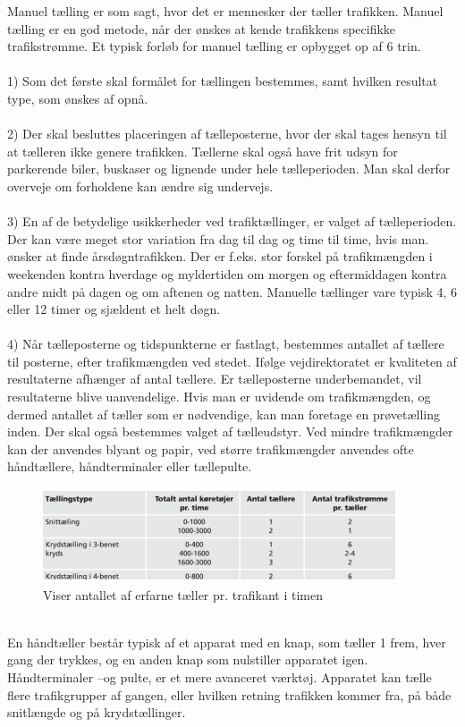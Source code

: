 Manuel tælling er som sagt, hvor det er mennesker der tæller trafikken. Manuel tælling er en god metode,
når der ønskes at kende trafikkens specifikke trafikstrømme. Et typisk forløb for manuel tælling er opbygget
op af 6 trin.
\\\\
1) Som det første skal formålet for tællingen bestemmes, samt hvilken resultat type, som ønskes af opnå.
\\\\
2) Der skal besluttes placeringen af tælleposterne, hvor der skal tages hensyn til at tælleren ikke genere
trafikken. Tællerne skal også have frit udsyn for parkerende biler, buskaser og lignende under hele
tælleperioden. Man skal derfor overveje om forholdene kan ændre sig undervejs.
\\\\
3) En af de betydelige usikkerheder ved trafiktællinger, er valget af tælleperioden. Der kan være meget stor
variation fra dag til dag og time til time, hvis man. ønsker at finde årsdøgntrafikken. Der er f.eks. stor forskel
på trafikmængden i weekenden kontra hverdage og myldertiden om morgen og eftermiddagen kontra
andre midt på dagen og om aftenen og natten. Manuelle tællinger vare typisk 4, 6 eller 12 timer og
sjældent et helt døgn.
\\\\
4) Når tælleposterne og tidspunkterne er fastlagt, bestemmes antallet af tællere til posterne, efter
trafikmængden ved stedet. Ifølge vejdirektoratet er kvaliteten af resultaterne afhænger af antal tællere. Er
tælleposterne underbemandet, vil resultaterne blive uanvendelige. Hvis man er uvidende om
trafikmængden, og dermed antallet af tæller som er nødvendige, kan man foretage en prøvetælling inden.
Der skal også bestemmes valget af tælleudstyr. Ved mindre trafikmængder kan der anvendes blyant og papir, ved større trafikmængder anvendes ofte håndtællere, håndterminaler eller tællepulte.
\begin{figure}[htbp]
  \label{fig:taellingstabel}
  \centering
  \begin{adjustbox}{max width=\textwidth}
    \includegraphics{billederogfigur/Taellingstabel.png} %
 \end{adjustbox}
  \caption{Viser antallet af erfarne tæller pr. trafikant i timen}
\end{figure}
\\
En håndtæller består typisk af et apparat med en knap, som tæller 1 frem, hver gang der trykkes, og en anden knap som nulstiller apparatet igen. Håndterminaler –og pulte, er et mere avanceret værktøj. Apparatet kan tælle flere trafikgrupper af gangen, eller hvilken retning trafikken kommer fra, på både snitlængde og på krydstællinger.

